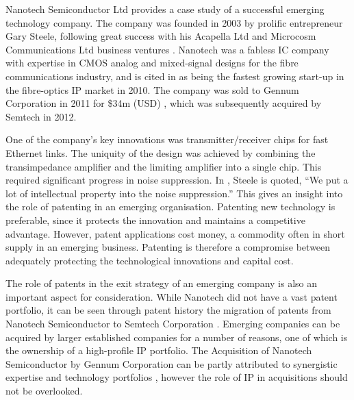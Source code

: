 {}
Nanotech Semiconductor Ltd provides a case study of a successful emerging technology company. 
The company was founded in 2003 by prolific entrepreneur Gary Steele, following great success with his Acapella Ltd and Microcosm Communications Ltd business ventures \cite{GazNesta}.
Nanotech was a fabless IC company with expertise in CMOS analog and mixed-signal designs for the fibre communications industry, and is cited in \cite{GazLightwave} as being the fastest growing start-up in the fibre-optics IP market in 2010.
The company was sold to Gennum Corporation in 2011 for \$34m (USD) \cite{GazBloom}, which was subsequently acquired by Semtech in 2012.
 
One of the company's key innovations was transmitter/receiver chips for fast Ethernet links.
The uniquity of the design was achieved by combining the transimpedance amplifier and the limiting amplifier into a single chip.
This required significant progress in noise suppression.
In \cite{GazEW}, Steele is quoted, ``We put a lot of intellectual property into the noise suppression.''
This gives an insight into the role of patenting in an emerging organisation.
Patenting new technology is preferable, since it protects the innovation and maintains a competitive advantage.
However, patent applications cost money, a commodity often in short supply in an emerging business.
Patenting is therefore a compromise between adequately protecting the technological innovations and capital cost.

The role of patents in the exit strategy of an emerging company is also an important aspect for consideration.
While Nanotech did not have a vast patent portfolio, it can be seen through patent history the migration of patents from Nanotech Semiconductor to Semtech Corporation \cite{nuttgens2013closed1} \cite{nuttgens2013closed2}.
Emerging companies can be acquired by larger established companies for a number of reasons, one of which is the ownership of a high-profile IP portfolio.
The Acquisition of Nanotech Semiconductor by Gennum Corporation can be partly attributed to synergistic expertise and technology portfolios \cite{GazBloom}, however the role of IP in acquisitions should not be overlooked.
 
